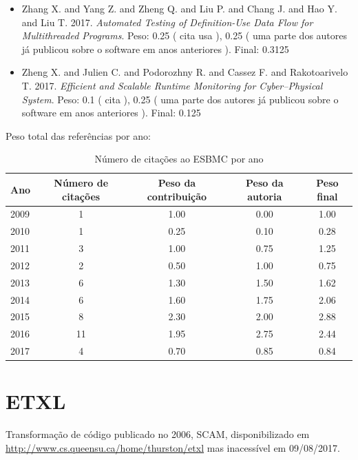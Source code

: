 \begin{itemize}
\item Zhang X. and Yang Z. and Zheng Q. and Liu P. and Chang J. and Hao Y. and Liu T.
      2017.
        \textit{ Automated Testing of Definition-Use Data Flow for Multithreaded Programs}.
      Peso:
      0.25 (
          cita
          usa
      ),
      0.25 (
uma parte dos autores já publicou sobre o software em anos anteriores
      ).
      Final:
      0.3125

\item Zheng X. and Julien C. and Podorozhny R. and Cassez F. and Rakotoarivelo T.
      2017.
        \textit{ Efficient and Scalable Runtime Monitoring for Cyber--Physical System}.
      Peso:
      0.1 (
          cita
      ),
      0.25 (
uma parte dos autores já publicou sobre o software em anos anteriores
      ).
      Final:
      0.125

\end{itemize}

Peso total das referências por ano:

\begin{table}[h]
\caption{Número de citações ao ESBMC  por ano}
\centering
\begin{tabular}{| l | c | c | c | c |}
  \hline
  Ano & Número de citações & Peso da contribuição & Peso da autoria & Peso final \\
  \hline
  2009
    & 1
    & 1.00
    & 0.00
    & 1.00 \\
  2010
    & 1
    & 0.25
    & 0.10
    & 0.28 \\
  2011
    & 3
    & 1.00
    & 0.75
    & 1.25 \\
  2012
    & 2
    & 0.50
    & 1.00
    & 0.75 \\
  2013
    & 6
    & 1.30
    & 1.50
    & 1.62 \\
  2014
    & 6
    & 1.60
    & 1.75
    & 2.06 \\
  2015
    & 8
    & 2.30
    & 2.00
    & 2.88 \\
  2016
    & 11
    & 1.95
    & 2.75
    & 2.44 \\
  2017
    & 4
    & 0.70
    & 0.85
    & 0.84 \\
  \hline
\end{tabular}
\end{table}


\section{ETXL}

Transformação de código
publicado no 2006, SCAM,
disponibilizado em \url{http://www.cs.queensu.ca/home/thurston/etxl}
mas inacessível em 09/08/2017.

